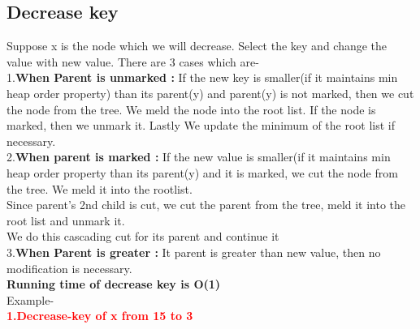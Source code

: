 \documentclass[14pt,a4paper]{report}
\begin{document}
\subsection{Decrease key}
Suppose x is the node which we will decrease. Select the key and change the value with new value. There are 3 cases which are-\\
1.\textbf{When Parent is unmarked : } If the new key is smaller(if it maintains min heap order property) than its parent(y) and parent(y) is not marked, then we cut the node from the tree. We meld the node into the root list. If the node is marked, then we unmark it. Lastly We update the minimum of the root list if necessary.\\
2.\textbf{When parent is marked : } If the new value is smaller(if it maintains min heap order property than its parent(y) and it is marked, we cut the node from the tree. We meld it into the rootlist.\\
Since parent's 2nd child is cut, we cut the parent from the tree, meld it into the root list and unmark it.\\ We do this cascading cut for its parent and continue it\\
3.\textbf{When Parent is greater : }It parent is greater than new value, then no modification is necessary.\\[0.3cm]
\textbf{Running time of decrease key is O(1)}\\[0.3cm]
Example-\\
    \textbf{\textcolor{red}{1.Decrease-key of x from 15 to 3}}
    \newline
\end{document}
